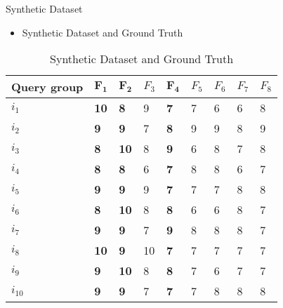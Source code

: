 \documentclass[
size=14pt,
paper=smartboard,  %
mode=present, 		%
display=slides, 	%
style=tuliplab,  	%
pauseslide,
fleqn,leqno]{powerdot}
\begin{document}
\begin{slide}{Synthetic Dataset}
	
	\begin{itemize}
		\item Synthetic Dataset and Ground Truth
	\end{itemize}
	
	\begin{table}
		\setlength{\abovecaptionskip}{0pt}
		\setlength{\belowcaptionskip}{10pt}
		\centering
		\caption{Synthetic Dataset and Ground Truth}
		
		\begin{tabular}{p{2.8cm}p{0.9cm}p{0.9cm}p{0.9cm}p{0.9cm}p{0.9cm}p{0.9cm}p{0.9cm}p{0.9cm}}
			\hline
			Query group  & $\mathbf{F_1}$ & $\mathbf{F_2}$ & $F_3$ & $\mathbf{F_4}$ & $F_5$ & $F_6$ & $F_7$ & $F_8$\\
			\hline
			$i_1$   & \bf{10} & \bf{8}  & 9  & \bf{7}  & 7 & 6 & 6  & 8\\
			$i_2$   & \bf{9}  & \bf{9}  & 7  & \bf{8}  & 9 & 9 & 8  & 9\\
			$i_3$   & \bf{8}  & \bf{10} & 8  & \bf{9}  & 6 & 8 & 7  & 8\\
			$i_4$   & \bf{8}  & \bf{8}  & 6  & \bf{7}  & 8 & 8 & 6  & 7\\
			$i_5$   & \bf{9}  & \bf{9}  & 9  & \bf{7}  & 7 & 7 & 8  & 8\\
			$i_6$   & \bf{8}  & \bf{10} & 8  & \bf{8}  & 6 & 6 & 8  & 7\\
			$i_7$   & \bf{9}  & \bf{9}  & 7  & \bf{9}  & 8 & 8 & 8  & 7\\
			$i_8$   & \bf{10} & \bf{9}  & 10 & \bf{7}  & 7 & 7 & 7  & 7\\
			$i_9$   & \bf{9}  & \bf{10} & 8  & \bf{8}  & 7 & 6 & 7  & 7\\
			$i_{10}$& \bf{9}  & \bf{9}  & 7  & \bf{7}  & 7 & 8 & 8  & 8\\
			\hline
		\end{tabular}
	\end{table}
	
	
\end{slide}
\end{document}
